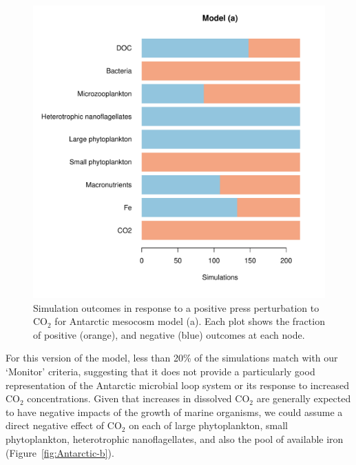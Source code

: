 \documentclass[a4paper]{article}\usepackage[]{graphicx}\usepackage[]{color}
\makeatletter
\def\maxwidth{ %
  \ifdim\Gin@nat@width>\linewidth
    \linewidth
  \else
    \Gin@nat@width
  \fi
}
\newenvironment{knitrout}{}{} %
\makeatother
\begin{document}
\begin{figure}[ht]
  \centering
\begin{knitrout}
\color{fgcolor}
\includegraphics[width=\maxwidth]{figure/unnamed-chunk-6-1} 

\end{knitrout}
\caption{Simulation outcomes in response to a positive press perturbation to
  $\mathrm{CO}_{2}$ for Antarctic mesocosm model (a). Each plot shows the fraction of
  positive (orange), and negative (blue) outcomes at each node.}
  \label{fig:Perturb2}
\end{figure}
\clearpage

For this version of the model, less than 20\% of the simulations match with our
`Monitor' criteria, suggesting that it does not provide a particularly good
representation of the Antarctic microbial loop system or its response to
increased $\mathrm{CO}_{2}$ concentrations. Given that increases in
dissolved $\mathrm{CO}_{2}$ are generally expected to have negative impacts of the growth
of marine organisms, we could assume a direct negative effect of $\mathrm{CO}_{2}$ on each
of large phytoplankton, small phytoplankton, heterotrophic nanoflagellates, and
also the pool of available iron (Figure~\ref{fig:Antarctic-b}).
\vspace{1cm}
\end{document}
